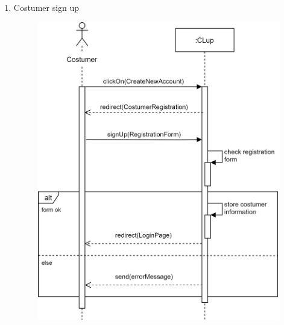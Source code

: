 \documentclass[]{article}
\begin{document}
\begin{enumerate}
						\item Costumer sign up
						\bigskip\bigskip\bigskip
						\begin{figure}[H]
							\centering
							\includegraphics[scale=1.1]{signup.png}
							\caption{}
							\label{fig:signup_sequencediagramm}
						\end{figure}
						\newpage
						

\end{enumerate}
\end{document}
